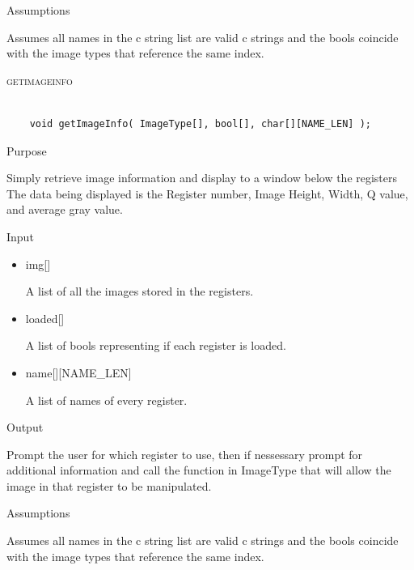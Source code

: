 \documentclass[pdftex, 11pt]{article}
\begin{document}
\begin{description}
\begin{description}
			\item{Assumptions}

				Assumes all names in the c string list are valid c
				strings and the bools coincide with the image types that
				reference the same index.

		\end{description}



	\item{\textsc{getimageinfo}}

		\begin{lstlisting}

	void getImageInfo( ImageType[], bool[], char[][NAME_LEN] );
		\end{lstlisting}

		\begin{description}
			\item{Purpose}

				Simply retrieve image information and display to a window below the registers
				The data being displayed is the Register number, Image Height, Width, Q value,
				and average gray value.

			\item{Input}

				\begin{itemize}

					\item{img[]}

						A list of all the images stored in the registers.

					\item{loaded[]}

						A list of bools representing if each register is loaded.

					\item{name[][NAME\_LEN]}

						A list of names of every register.

				\end{itemize}

			\item{Output}

				Prompt the user for which register to use, then if nessessary
				prompt for additional information and call the function
				in ImageType that will allow the image in that register to
				be manipulated.

			\item{Assumptions}

				Assumes all names in the c string list are valid c
				strings and the bools coincide with the image types that
				reference the same index.


\end{description}
\end{description}
\end{document}
